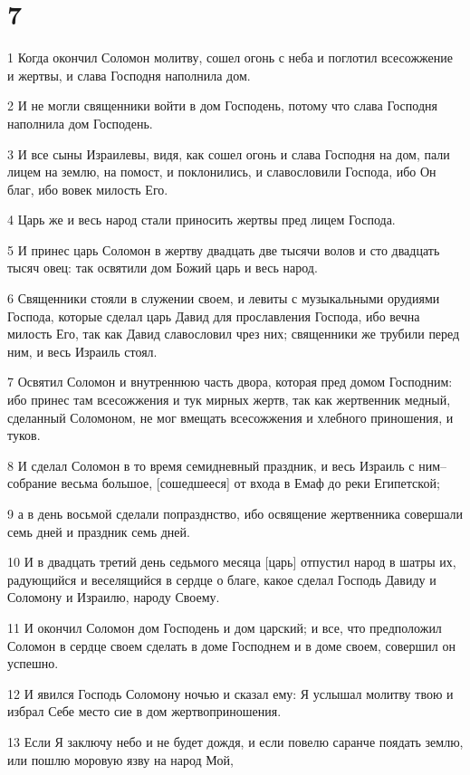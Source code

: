 \chapter{7}

\par 1 Когда окончил Соломон молитву, сошел огонь с неба и поглотил всесожжение и жертвы, и слава Господня наполнила дом.
\par 2 И не могли священники войти в дом Господень, потому что слава Господня наполнила дом Господень.
\par 3 И все сыны Израилевы, видя, как сошел огонь и слава Господня на дом, пали лицем на землю, на помост, и поклонились, и славословили Господа, ибо Он благ, ибо вовек милость Его.
\par 4 Царь же и весь народ стали приносить жертвы пред лицем Господа.
\par 5 И принес царь Соломон в жертву двадцать две тысячи волов и сто двадцать тысяч овец: так освятили дом Божий царь и весь народ.
\par 6 Священники стояли в служении своем, и левиты с музыкальными орудиями Господа, которые сделал царь Давид для прославления Господа, ибо вечна милость Его, так как Давид славословил чрез них; священники же трубили перед ним, и весь Израиль стоял.
\par 7 Освятил Соломон и внутреннюю часть двора, которая пред домом Господним: ибо принес там всесожжения и тук мирных жертв, так как жертвенник медный, сделанный Соломоном, не мог вмещать всесожжения и хлебного приношения, и туков.
\par 8 И сделал Соломон в то время семидневный праздник, и весь Израиль с ним--собрание весьма большое, [сошедшееся] от входа в Емаф до реки Египетской;
\par 9 а в день восьмой сделали попразднство, ибо освящение жертвенника совершали семь дней и праздник семь дней.
\par 10 И в двадцать третий день седьмого месяца [царь] отпустил народ в шатры их, радующийся и веселящийся в сердце о благе, какое сделал Господь Давиду и Соломону и Израилю, народу Своему.
\par 11 И окончил Соломон дом Господень и дом царский; и все, что предположил Соломон в сердце своем сделать в доме Господнем и в доме своем, совершил он успешно.
\par 12 И явился Господь Соломону ночью и сказал ему: Я услышал молитву твою и избрал Себе место сие в дом жертвоприношения.
\par 13 Если Я заключу небо и не будет дождя, и если повелю саранче поядать землю, или пошлю моровую язву на народ Мой,
